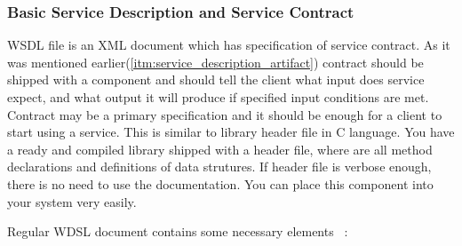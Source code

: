 \subsubsection{Basic Service Description and Service Contract}
\label{sec:ws_service_contract}
\gls{WSDL} file is an \gls{XML} document which has specification of  service contract.
As it was mentioned earlier(\autoref{itm:service_description_artifact}) contract should be shipped with a component and should  tell the
client what input does service expect, and what output it will produce if specified input conditions are met. 
Contract may be a primary specification and it should be enough for a client to start using a service.
This is similar to library header file in C language. 
You have a ready and compiled library shipped with a header file, where are all method declarations and definitions of data strutures. 
If header file is verbose enough, there is no need to use the documentation. You can place this component into your system very easily.



Regular \gls{WDSL} document contains some necessary elements ~\cite{wsdl_language_spec, wikipedia:WSDL}:


